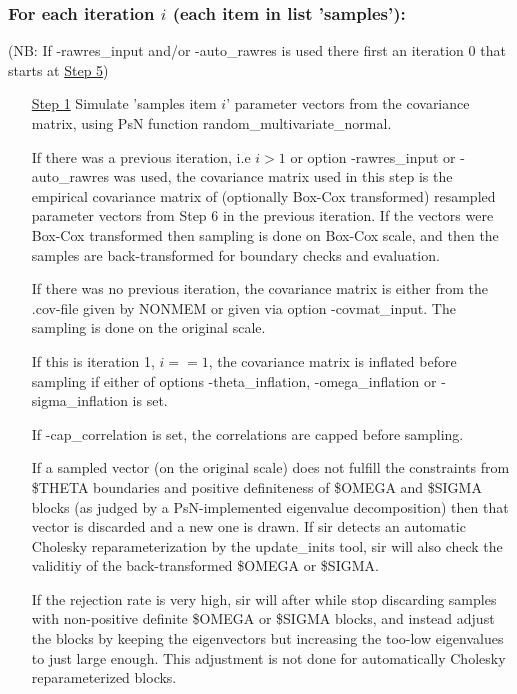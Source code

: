 \subsubsection*{For each iteration $i$ (each item in list 'samples'):}
(NB: If -rawres\_input and/or -auto\_rawres is used there first an iteration 0 that starts at \underline{Step 5})
\begin{itemize}
\item[\underline{Step 1}]
Simulate 'samples item $i$' parameter vectors from the covariance matrix, using PsN function random\_multivariate\_normal.

\noindent If there was a previous iteration, i.e $i>1$ or option -rawres\_input or -auto\_rawres was used, the covariance matrix used in this step is the empirical covariance matrix of (optionally Box-Cox transformed) resampled parameter vectors from Step 6 in the previous iteration.
If the vectors were Box-Cox transformed then sampling is done on Box-Cox scale, and then the samples are back-transformed for boundary checks and evaluation.

\noindent If there was no previous iteration, the covariance matrix is either from the .cov-file given by NONMEM or given via option -covmat\_input. The sampling is done on the original scale.

\noindent If this is iteration 1, $i==1$, the covariance matrix is inflated before sampling if either of options -theta\_inflation, -omega\_inflation or -sigma\_inflation is set.

\noindent If -cap\_correlation is set, the correlations are capped before sampling.

\noindent If a sampled vector (on the original scale) does not fulfill the constraints from \$THETA boundaries
and positive definiteness of \$OMEGA and \$SIGMA blocks (as judged by a PsN-implemented eigenvalue decomposition) then that vector is discarded and a new one is drawn. If sir detects an automatic Cholesky reparameterization by the update\_inits tool, sir will also check the validitiy of the back-transformed \$OMEGA or \$SIGMA.

\noindent If the rejection rate is very high, sir will after while stop discarding samples with non-positive definite
\$OMEGA or \$SIGMA blocks, and instead adjust the blocks by keeping the eigenvectors but increasing the too-low eigenvalues to just large enough. This adjustment is not done for automatically Cholesky reparameterized blocks.


\end{itemize}
